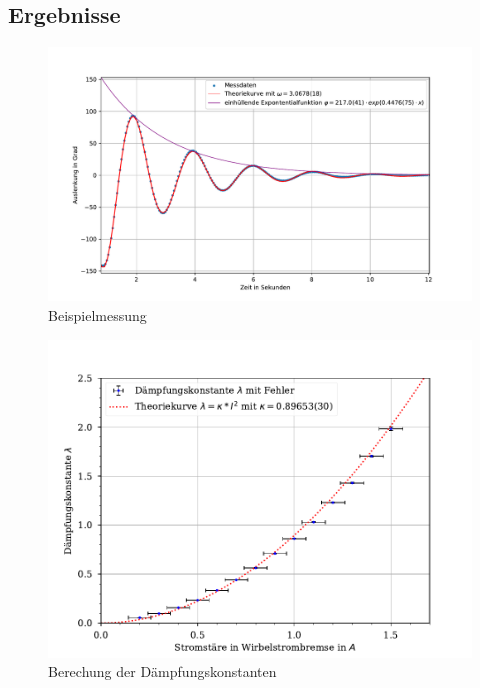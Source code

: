 \documentclass[11pt, a4paper]{article}
\begin{document}
    \subsection{Ergebnisse}
    \begin{figure}
        \centering
        \includegraphics[width=\textwidth]{./6fits.pdf}

        \caption{Beispielmessung}
        \label{fig:beis}
    \end{figure}
    \begin{figure}
        \centering
        \includegraphics[width=\textwidth]{./6Plot.pdf}

        \caption{Berechung der Dämpfungskonstanten}
        \label{fig:daempf}
    \end{figure}
\end{document}
